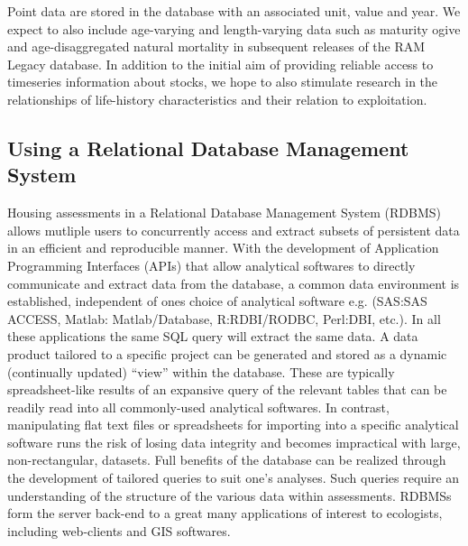 \documentclass[letterpaper,12pt]{article}
\begin{document}
Point data are stored in the database with an associated unit, value
and year. We expect to also include age-varying and length-varying
data such as maturity ogive and age-disaggregated natural mortality in
subsequent releases of the RAM Legacy database. In addition to the
initial aim of providing reliable access to timeseries information
about stocks, we hope to also stimulate research in the relationships
of life-history characteristics and their relation to exploitation.

\subsection{Using a Relational Database Management System}
Housing assessments in a Relational Database Management System (RDBMS)
allows mutliple users to concurrently access and extract subsets of
persistent data in an efficient and reproducible manner. With the
development of Application Programming Interfaces (APIs) that allow
analytical softwares to directly communicate and extract data from the
database, a common data environment is established, independent of
ones choice of analytical software e.g. (SAS:SAS ACCESS, Matlab:
Matlab/Database, R:RDBI/RODBC, Perl:DBI, etc.). In all these
applications the same SQL query will extract the same data. A data
product tailored to a specific project can be generated and stored as
a dynamic (continually updated) ``view'' within the database. These
are typically spreadsheet-like results of an expansive query of the
relevant tables that can be readily read into all commonly-used
analytical softwares. In contrast, manipulating flat text files or spreadsheets for
importing into a specific analytical software runs the risk of losing
data integrity and becomes impractical with large, non-rectangular,
datasets. Full benefits of the database can be realized through the
development of tailored queries to suit one's analyses. Such queries
require an understanding of the structure of the various data within
assessments. RDBMSs form the server back-end to a great many
applications of interest to ecologists, including web-clients and GIS
softwares. 
\end{document}

